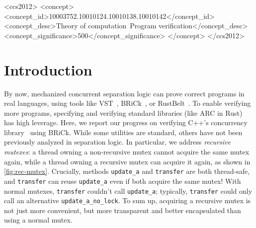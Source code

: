 \documentclass[sigplan,screen]{acmart}
\begin{document}
\begin{CCSXML}
<ccs2012>
<concept>
<concept_id>10003752.10010124.10010138.10010142</concept_id>
<concept_desc>Theory of computation~Program verification</concept_desc>
<concept_significance>500</concept_significance>
</concept>
</ccs2012>
\end{CCSXML}



\maketitle

\section{Introduction}
By now, mechanized concurrent separation logic can prove correct programs in real languages, using tools like VST~\cite{vst}, BRiCk~\cite{brick}, or RustBelt~\cite{rustbelt}.
To enable verifying more programs, specifying and verifying standard libraries (like ARC in Rust) has high leverage.
Here, we report our progress on verifying C++'s concurrency library~\cite{ISO:2024:IIP} using BRiCk. While some utilities are standard, others have not been previously
analyzed in separation logic.
In particular, we address \emph{recursive mutexes}:
a thread owning a non-recursive mutex cannot acquire the same mutex again,
while a thread owning a recursive mutex can acquire it again, as shown in \cref{fig:rec-mutex}.
Crucially, methods \verb!update_a! and \verb!transfer! are both thread-safe, and
\verb!transfer! can reuse \verb!update_a! even if both acquire the same mutex!
With normal mutexes, \verb!transfer! couldn't call \verb!update_a!; typically,
\verb!transfer! could only call an alternative \verb!update_a_no_lock!.
To sum up, acquiring a recursive mutex is not just more convenient, but more
transparent and better encapsulated than using a normal mutex.
\end{document}
